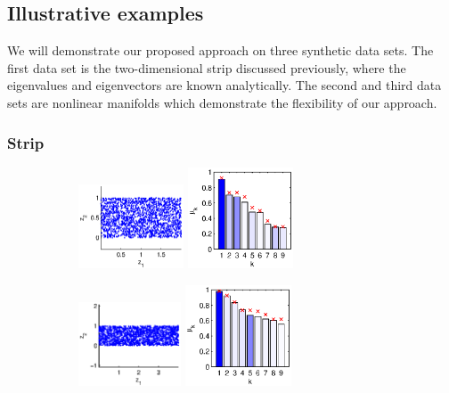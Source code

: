 \documentclass[preprint]{elsarticle}
\begin{document}
\subsection{Illustrative examples} \label{sec:illustrative_examples}

We will demonstrate our proposed approach on three synthetic data sets. 
%
The first data set is the two-dimensional strip discussed previously, where the eigenvalues and eigenvectors are known analytically.
%
The second and third data sets are nonlinear manifolds which demonstrate the flexibility of our approach. 

\subsubsection{Strip}

\begin{figure}[t]
\centering
\begin{subfigure}{0.3\textwidth}
\includegraphics[height=2.5cm]{strip_data_L2}
\includegraphics[height=3cm]{strip_spectrum_L2}
\caption{}
\end{subfigure}
%
\hfill
%
\begin{subfigure}{0.3\textwidth}
\includegraphics[height=2.5cm]{strip_data_L4}
\includegraphics[height=3cm]{strip_spectrum_L4}
\caption{}

\end{subfigure}
\end{figure}
\end{document}
